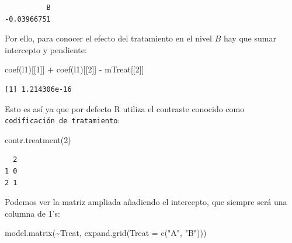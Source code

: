 \documentclass[
  12pt,
  a4paper,
  extrafontsizes,
  onecolumn,
  openright]{memoir}
\newenvironment{Shaded}{\begin{snugshade}}{\end{snugshade}}
\newcommand{\AttributeTok}[1]{\textcolor[rgb]{0.40,0.45,0.13}{#1}}
\newcommand{\DecValTok}[1]{\textcolor[rgb]{0.68,0.00,0.00}{#1}}
\newcommand{\FunctionTok}[1]{\textcolor[rgb]{0.28,0.35,0.67}{#1}}
\newcommand{\NormalTok}[1]{\textcolor[rgb]{0.00,0.23,0.31}{#1}}
\newcommand{\SpecialCharTok}[1]{\textcolor[rgb]{0.37,0.37,0.37}{#1}}
\newcommand{\StringTok}[1]{\textcolor[rgb]{0.13,0.47,0.30}{#1}}
\begin{document}
\begin{verbatim}
          B 
-0.03966751 
\end{verbatim}

\normalsize

Por ello, para conocer el efecto del tratamiento en el nivel \(B\) hay
que sumar intercepto y pendiente:

\scriptsize

\begin{Shaded}
\begin{Highlighting}[]
\FunctionTok{coef}\NormalTok{(l1)[[}\DecValTok{1}\NormalTok{]] }\SpecialCharTok{+} \FunctionTok{coef}\NormalTok{(l1)[[}\DecValTok{2}\NormalTok{]] }\SpecialCharTok{{-}}\NormalTok{ mTreat[[}\DecValTok{2}\NormalTok{]]}
\end{Highlighting}
\end{Shaded}

\begin{verbatim}
[1] 1.214306e-16
\end{verbatim}

\normalsize

Esto es así ya que por defecto R utiliza el contraste conocido como
\texttt{codificación\ de\ tratamiento}:

\scriptsize

\begin{Shaded}
\begin{Highlighting}[]
\FunctionTok{contr.treatment}\NormalTok{(}\DecValTok{2}\NormalTok{)}
\end{Highlighting}
\end{Shaded}

\begin{verbatim}
  2
1 0
2 1
\end{verbatim}

\normalsize

Podemos ver la matriz ampliada añadiendo el intercepto, que siempre será
una columna de 1's:

\scriptsize

\begin{Shaded}
\begin{Highlighting}[]
\FunctionTok{model.matrix}\NormalTok{(}\SpecialCharTok{\textasciitilde{}}\NormalTok{Treat, }\FunctionTok{expand.grid}\NormalTok{(}\AttributeTok{Treat =} \FunctionTok{c}\NormalTok{(}\StringTok{"A"}\NormalTok{, }\StringTok{"B"}\NormalTok{)))}
\end{Highlighting}
\end{Shaded}
\end{document}
